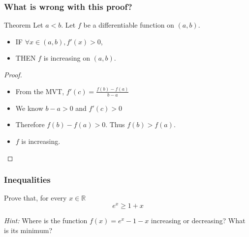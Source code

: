 \documentclass[14pt]{beamer}
\begin{document}
	\begin{frame}[t]
		\frametitle{What is wrong with this proof?}

		\begin{block}{Theorem}
			Let $a < b$. Let $f$ be a differentiable function on $(a,b)$.
			\begin{itemize}
				\item IF $\forall x \in (a,b), f'(x) >0$,

				\item THEN $f$ is increasing on $(a,b)$.
			\end{itemize}
		\end{block}

		\begin{proof}
			\begin{itemize}
				\item From the MVT, $\displaystyle  f'(c) = \frac{f(b) - f(a)}{b-a} $

				\item We know $\displaystyle b-a>0$ and $\displaystyle f'(c)>0$

				\item Therefore $\displaystyle f(b) - f(a)>0$. \quad Thus
					$\displaystyle f(b) > f(a)$.

				\item $f$ is increasing.
			\end{itemize}
		\end{proof}
	\end{frame}
	\begin{frame}[t]
		\frametitle{Inequalities}

		Prove that, for every $x \in \mathbb{R}$
		\[
			e^{x}\geq 1 + x
		\]

		\medskip
		\emph{Hint:} Where is the function $\displaystyle f(x) =e^x - 1-x$ increasing
		or decreasing? What is its minimum?
	\end{frame}
\end{document}
